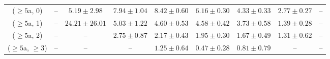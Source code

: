 \begin{table}[h!]
{\begin{tabular}{ccccccccc}
	($\ge5$a, 0) & -- & $5.19\pm 2.98$ & $7.94\pm 1.04$ & $8.42\pm 0.60$ & $6.16\pm 0.30$ & $4.33\pm 0.33$ & $2.77\pm 0.27$ & -- \\[0.5ex] 
	($\ge5$a, 1) & -- & $24.21\pm 26.01$ & $5.03\pm 1.22$ & $4.60\pm 0.53$ & $4.58\pm 0.42$ & $3.73\pm 0.58$ & $1.39\pm 0.28$ & -- \\[0.5ex] 
	($\ge5$a, 2) & -- & -- & $2.75\pm 0.87$ & $2.17\pm 0.43$ & $1.95\pm 0.30$ & $1.67\pm 0.49$ & $1.31\pm 0.62$ & -- \\[0.5ex] 
	($\ge5$a, $\ge3$) & -- & -- & -- & $1.25\pm 0.64$ & $0.47\pm 0.28$ & $0.81\pm 0.79$ & -- & -- \\[0.5ex] 
	\hline
	\hline
\end{tabular}}
\end{table}
